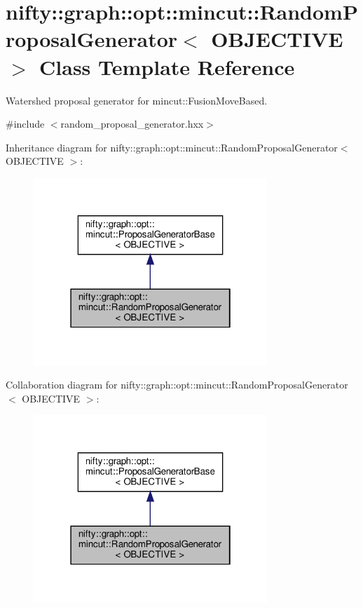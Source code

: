 \hypertarget{classnifty_1_1graph_1_1opt_1_1mincut_1_1RandomProposalGenerator}{}\section{nifty\+:\+:graph\+:\+:opt\+:\+:mincut\+:\+:Random\+Proposal\+Generator$<$ O\+B\+J\+E\+C\+T\+I\+VE $>$ Class Template Reference}
\label{classnifty_1_1graph_1_1opt_1_1mincut_1_1RandomProposalGenerator}


Watershed proposal generator for mincut\+::\+Fusion\+Move\+Based.  




{\ttfamily \#include $<$random\+\_\+proposal\+\_\+generator.\+hxx$>$}



Inheritance diagram for nifty\+:\+:graph\+:\+:opt\+:\+:mincut\+:\+:Random\+Proposal\+Generator$<$ O\+B\+J\+E\+C\+T\+I\+VE $>$\+:
\nopagebreak
\begin{figure}[H]
\begin{center}
\leavevmode
\includegraphics[width=250pt]{classnifty_1_1graph_1_1opt_1_1mincut_1_1RandomProposalGenerator__inherit__graph}
\end{center}
\end{figure}


Collaboration diagram for nifty\+:\+:graph\+:\+:opt\+:\+:mincut\+:\+:Random\+Proposal\+Generator$<$ O\+B\+J\+E\+C\+T\+I\+VE $>$\+:
\nopagebreak
\begin{figure}[H]
\begin{center}
\leavevmode
\includegraphics[width=250pt]{classnifty_1_1graph_1_1opt_1_1mincut_1_1RandomProposalGenerator__coll__graph}
\end{center}
\end{figure}
